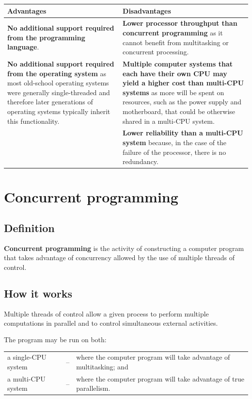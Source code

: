\documentclass[a4paper]{systems-software}
\begin{document}
\begin{longtabu} to \textwidth {|X[1,l]|X[1,l]|}
    \hline
    \textbf{Advantages} & \textbf{Disadvantages}
    \\ \hline
    \textbf{No additional support required from the programming language}.
    &
    \textbf{Lower processor throughput than concurrent programming} as it cannot benefit from multitasking or concurrent processing.
    \\ \hline
  	\textbf{No additional support required from the operating system} as most old-school operating systems were generally single-threaded and therefore later generations of operating systems typically inherit this functionality.
    &
    \textbf{Multiple computer systems that each have their own CPU may yield a higher cost than multi-CPU systems} as more will be spent on resources, such as the power supply and motherboard, that could be otherwise shared in a multi-CPU system.
    \\ \hline
    &
    \textbf{Lower reliability than a multi-CPU system} because, in the case of the failure of the processor, there is no redundancy.
	\\ \hline
\end{longtabu}


\section*{Concurrent programming}

\subsection*{Definition}

\textbf{Concurrent programming} is the activity of constructing a computer program that takes advantage of concurrency allowed by the use of multiple threads of control.


\subsection*{How it works}

Multiple threads of control allow a given process to perform multiple computations in parallel and to control simultaneous external activities.

The program may be run on both:
\begin{longtabu} to \textwidth { X[1.5,l] X[0.2,l] X[7,l]}
	\textbullet a single-CPU system
	& -- &
	where the computer program will take advantage of multitasking; and
	\\
	\textbullet a multi-CPU system
	& -- &
	where the computer program will take advantage of true parallelism.
\end{longtabu}
\end{document}
